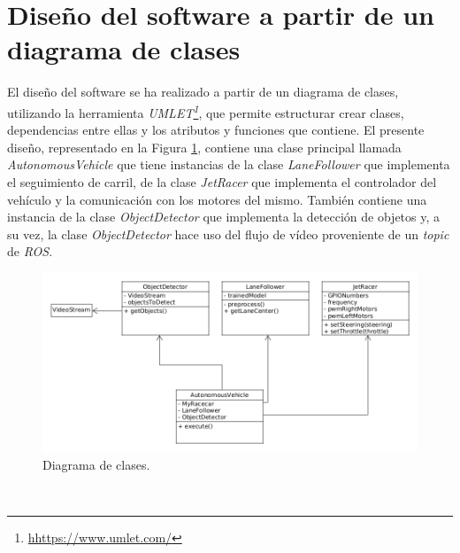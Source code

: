 \section{Diseño del software a partir de un diagrama de clases}
El diseño del software se ha realizado a partir de un diagrama de clases, utilizando la herramienta \textit{UMLET\footnote{\url{hhttps://www.umlet.com/}}}, que permite estructurar crear clases, dependencias entre ellas y los atributos y funciones que contiene. El presente diseño, representado en la Figura \ref{fig:diagram}, contiene una clase principal llamada \textit{AutonomousVehicle} que tiene instancias de la clase \textit{LaneFollower} que implementa el seguimiento de carril, de la clase \textit{JetRacer} que implementa el controlador del vehículo y la comunicación con los motores del mismo. También contiene una instancia de la clase \textit{ObjectDetector} que implementa la detección de objetos y, a su vez, la clase \textit{ObjectDetector} hace uso del flujo de vídeo proveniente de un \textit{topic} de \textit{ROS}.
\begin{figure} [h!]
	\begin{center}
		\includegraphics[width=14cm]{figs/diagram5}
	\end{center}
	\caption{Diagrama de clases.}
	\label{fig:diagram}
\end{figure}\
